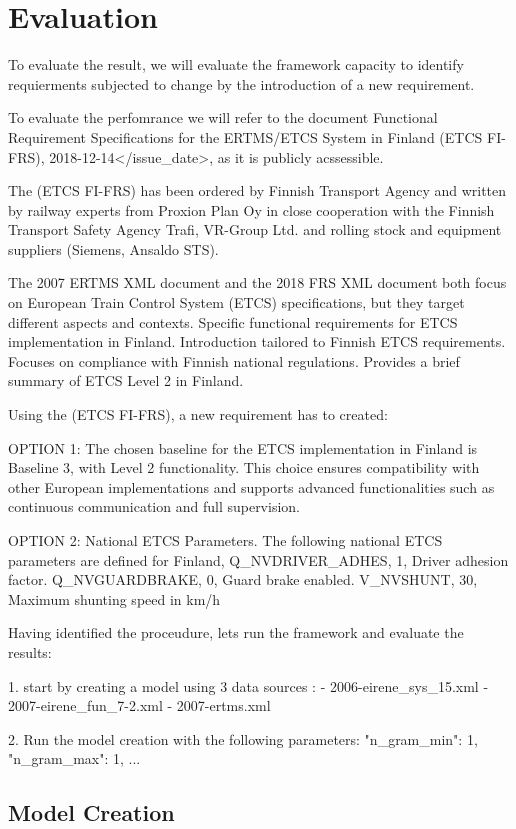 \chapter{Evaluation} \label{chap:chap6}

To evaluate the result, we will evaluate the framework capacity to identify requierments subjected to change by the introduction of a new requirement.

To evaluate the perfomrance we will refer to the document Functional Requirement Specifications for the ERTMS/ETCS System in Finland (ETCS FI-FRS), 2018-12-14</issue_date>, as it is publicly acssessible. 


The (ETCS FI-FRS) has been ordered by Finnish Transport Agency and written by railway experts from Proxion Plan Oy in close cooperation with the Finnish
Transport Safety Agency Trafi, VR-Group Ltd. and rolling stock and equipment suppliers (Siemens, Ansaldo STS).

The 2007 ERTMS XML document and the 2018 FRS XML document both focus on European Train Control System (ETCS) specifications, but they target different aspects and contexts. 
Specific functional requirements for ETCS implementation in Finland.
Introduction tailored to Finnish ETCS requirements.
Focuses on compliance with Finnish national regulations.
Provides a brief summary of ETCS Level 2 in Finland.


Using the (ETCS FI-FRS), a new requirement has to created:

OPTION 1: The chosen baseline for the ETCS implementation in Finland is Baseline 3, with Level 2 functionality. This choice ensures compatibility with other European implementations and supports advanced functionalities such as continuous communication and full supervision.

OPTION 2: National ETCS Parameters. The following national ETCS parameters are defined for Finland, Q_NVDRIVER_ADHES, 1, Driver adhesion factor. Q_NVGUARDBRAKE, 0, Guard brake enabled. V_NVSHUNT, 30, Maximum shunting speed in km/h


Having identified the proceudure, lets run the framework and evaluate the results:

1.
start by creating a model using 3 data sources :
- 2006-eirene_sys_15.xml 
- 2007-eirene_fun_7-2.xml 
- 2007-ertms.xml

2. Run the model creation with the following parameters: 
"n_gram_min": 1,
"n_gram_max": 1,
...




\section{Model Creation}
